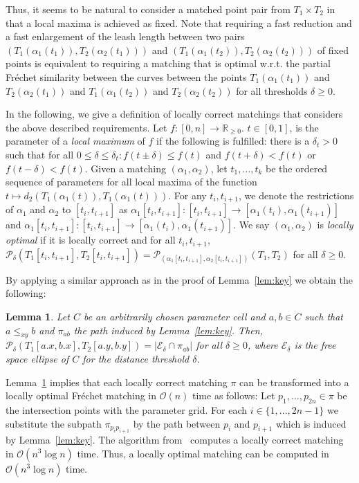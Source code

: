 \documentclass[a4paper,11pt]{article}
\newtheorem{lemma}{Lemma}
\begin{document}
	 Thus, it seems to be natural to consider a matched point pair from $T_1 \times T_2$ in that a local maxima is achieved as fixed. Note that requiring a fast reduction and a fast enlargement of the leash length between two pairs $(T_1(\alpha_1(t_1)),T_2(\alpha_2(t_{1})))$ and $(T_1(\alpha_1(t_{2})),T_2(\alpha_2(t_{2})))$ of fixed points is equivalent to requiring a matching that is optimal w.r.t. the partial Fr\'{e}chet similarity between the curves between the points $T_1(\alpha_1(t_1))$ and $T_2(\alpha_2(t_{1}))$ and $T_1(\alpha_1(t_{2}))$ and $T_2(\alpha_2(t_{2}))$ for all thresholds $\delta \geq 0$. 
	 
	 In the following, we give a definition of locally correct matchings that considers the above described requirements.
	Let $f:[0,n] \rightarrow \mathbb{R}_{\geq0}$. $t \in [0,1]$, is the parameter of a \emph{local maximum} of $f$ if the following is fulfilled: there is a $\delta_t > 0$ such that for all $0 \leq \delta\leq \delta_t: f(t \pm \delta) \leq f(t)$ and $f(t + \delta) < f(t)$ or $f(t-\delta) < f(t)$. 
	Given a matching $(\alpha_1,\alpha_2)$, let $t_1, \dots , t_k$ be the ordered sequence of parameters for all local maxima of the function $t \mapsto d_2(T_1(\alpha_1(t)), T_1(\alpha_1(t)))$. For any $t_i,t_{i+1}$, we denote the restrictions of $\alpha_1$ and $\alpha_2$ to $[t_i,t_{i+1}]$ as $\alpha_1[t_i,t_{i+1}]: [t_i,t_{i+1}] \rightarrow [\alpha_1(t_i), \alpha_1(t_{i+1})]$ and $\alpha_1[t_i,t_{i+1}]: [t_i,t_{i+1}] \rightarrow [\alpha_1(t_i), \alpha_1(t_{i+1})]$.
	We say $(\alpha_1,\alpha_2)$ is \emph{locally optimal} if it is locally correct and for all $t_i,t_{i+1}$, $\mathcal{P}_{\delta}(T_1[t_i,t_{i+1}],T_2[t_i,t_{i+1}]) = \mathcal{P}_{(\alpha_1[t_i,t_{i+1}],\alpha_2[t_i,t_{i+1}])}(T_1,T_2)$ for all $\delta \geq 0$.
	
	By applying a similar approach as in the proof of Lemma~\ref{lem:key} we obtain the following:
	
\begin{lemma}\label{cor:partFS}
	Let $C$ be an arbitrarily chosen parameter cell and $a, b \in C$ such that $a \leq_{xy} b$ and $\pi_{ab}$ the path induced by Lemma~\ref{lem:key}. Then, $\mathcal{P}_{\delta}(T_1[a.x,b.x], T_2[a.y,b.y]) = |\mathcal{E}_{\delta} \cap \pi_{ab}|$ for all $\delta \geq 0$, where $\mathcal{E}_{\delta}$ is the free space ellipse of $C$ for the distance threshold $\delta$.
\end{lemma}

Lemma~\ref{cor:partFS} implies that each locally correct matching $\pi$ can be transformed into a locally optimal Fr\'{e}chet matching in $\mathcal{O}(n)$ time as follows: Let $p_1,\dots,p_{2n} \in \pi$ be the intersection points with the parameter grid. For each $i \in \{ 1,...,2n-1 \}$ we substitute the subpath $\pi_{p_ip_{i+1}}$ by the path between $p_{i}$ and $p_{i+1}$ which is induced by Lemma~\ref{lem:key}.
	The algorithm from~\cite{buchin:locally} computes a locally correct matching in $\mathcal{O}(n^3 \log n)$ time. Thus, a locally optimal matching can be computed in $\mathcal{O}(n^3 \log n)$ time.
\end{document}
